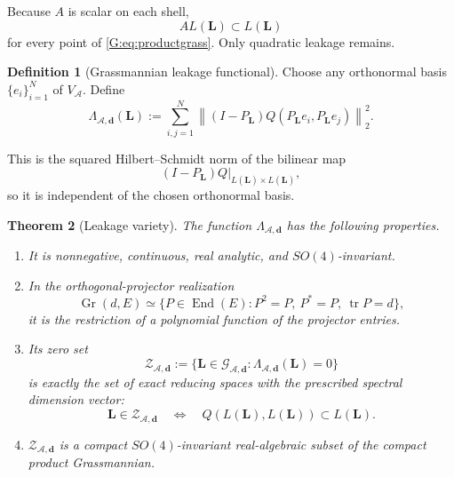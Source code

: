 \documentclass[
 aps,
 prd,
 reprint,
 amsmath,
 amssymb,
 nofootinbib,
 superscriptaddress
]{revtex4-2}
\newtheorem{theorem}{Theorem}[section]
\theoremstyle{definition}
\newtheorem{definition}[theorem]{Definition}
\theoremstyle{remark}
\newcommand{\cG}{\mathcal G}
\newcommand{\cZ}{\mathcal Z}
\newcommand{\Gr}{\operatorname{Gr}}
\newcommand{\tr}{\operatorname{tr}}
\begin{document}
Because $A$ is scalar on each shell,
\[
        A L(\mathbf L)\subset L(\mathbf L)
\]
for every point of \eqref{G:eq:productgrass}.  Only quadratic leakage remains.

\begin{definition}[Grassmannian leakage functional]
Choose any orthonormal basis $\{e_i\}_{i=1}^N$ of
$V_{\mathcal A}$.  Define
\begin{equation}
 \Lambda_{\mathcal A,\mathbf d}(\mathbf L)
 :=
 \sum_{i,j=1}^N
 \left\|
 (I-P_{\mathbf L})
 Q(P_{\mathbf L}e_i,P_{\mathbf L}e_j)
 \right\|_2^2.
 \label{G:eq:leakage}
\end{equation}
\end{definition}

This is the squared Hilbert--Schmidt norm of the bilinear map
\[
 (I-P_{\mathbf L})Q
 \big|_{L(\mathbf L)\times L(\mathbf L)},
\]
so it is independent of the chosen orthonormal basis.

\begin{theorem}[Leakage variety]
\label{G:thm:leakagevariety}
The function
$\Lambda_{\mathcal A,\mathbf d}$ has the following properties.

\begin{enumerate}[label=(\roman*)]
\item
It is nonnegative, continuous, real analytic, and $SO(4)$-invariant.

\item
In the orthogonal-projector realization
\[
 \Gr(d,E)
 \simeq
 \{P\in\operatorname{End}(E):
 P^2=P,\ P^*=P,\ \tr P=d\},
\]
it is the restriction of a polynomial function of the projector entries.

\item
Its zero set
\begin{equation}
 \cZ_{\mathcal A,\mathbf d}
 :=
 \{\mathbf L\in\cG_{\mathcal A,\mathbf d}:
 \Lambda_{\mathcal A,\mathbf d}(\mathbf L)=0\}
 \label{G:eq:Z}
\end{equation}
is exactly the set of exact reducing spaces with the prescribed spectral
dimension vector:
\begin{equation}
 \mathbf L\in\cZ_{\mathcal A,\mathbf d}
 \quad\Longleftrightarrow\quad
 Q(L(\mathbf L),L(\mathbf L))
 \subset L(\mathbf L).
 \label{G:eq:Zcriterion}
\end{equation}

\item
$\cZ_{\mathcal A,\mathbf d}$ is a compact $SO(4)$-invariant real-algebraic
subset of the compact product Grassmannian.
\end{enumerate}
\end{theorem}
\end{document}
